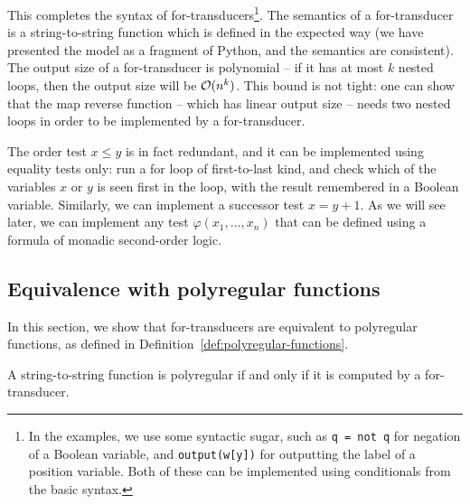 This completes the syntax of for-transducers\footnote{
  In the examples, we use some syntactic sugar, such as \texttt{q = not q} for negation of a Boolean variable, and \texttt{output(w[y])} for outputting the label of a position variable. Both of these can be implemented using conditionals from the basic syntax.
}.  The semantics of a for-transducer is a string-to-string function which is defined in the expected way (we have presented the model as a fragment of Python, and the semantics are consistent).
The output size of a for-transducer is polynomial -- if it has at most $k$ nested loops, then the output size will be ${\mathcal O}(n^k)$. This bound is not tight: one can show that the map reverse function -- which has linear output size -- needs two nested loops in order to be implemented by a for-transducer. 

\begin{myexample}
  The order test  $x \le y$ is in fact redundant, and it  can be implemented using equality tests only: run  a for loop of first-to-last kind, and check which of the variables $x$ or $y$ is seen  first in the loop, with the result remembered  in a Boolean variable. Similarly, we can implement a successor test $x = y+1$. As we will see later, we can implement any test $\varphi(x_1,\ldots,x_n)$ that can be defined using a formula of monadic second-order logic.
\end{myexample}

\subsection{Equivalence with polyregular functions}
\label{sec:for-transducers-equivalence}
In this section, we show that for-transducers are equivalent to polyregular functions, as defined in Definition~\ref{def:polyregular-functions}. 

\begin{theorem}
  \label{thm:for-transducers-are-polyregular}
  A string-to-string function is  polyregular if and only if it is computed by a for-transducer. 
\end{theorem}

